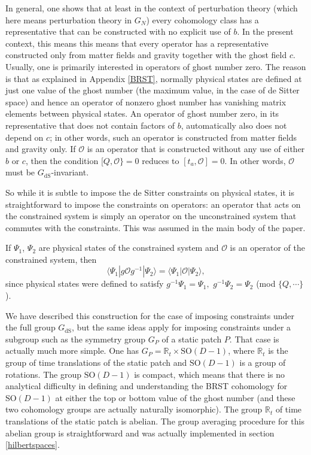 \documentclass[11pt,a4paper]{article}
\def\be{\begin{equation}}
\def\ee{\end{equation}}
\def\O{{\mathcal O}}
\def\R{{\mathbb R}}
\def\dS{{\mathrm{dS}}}
\def\SO{{\mathrm{SO}}}
\def\la{\langle}
\def\ra{\rangle}
\begin{document}
 In general, one shows that at least in the context of perturbation theory (which here means perturbation theory in $G_N$) every cohomology class has a representative that can be constructed with no explicit use of $b$. In the present
context, this  means this means that every operator has
a representative constructed only from matter fields and gravity together with the ghost field $c$.   
Usually, one is primarily interested in operators of ghost number zero.   The reason is that as explained in Appendix \ref{BRST}, normally physical states are defined at just one
value of the ghost number (the maximum value, in the case of de Sitter space) and hence an operator of nonzero ghost number has vanishing matrix elements
between physical states.  An operator of ghost number zero, in its representative that does not contain factors of $b$, automatically also 
does not depend on $c$; in other words, such an operator is constructed from matter fields and gravity only.
    If $\O$ is an operator that is constructed without any use of either $b$ or $c$,
then the condition $[Q,\O\}=0$ reduces to $[t_a,\O]=0$.  In  other words, $\O$ must be $G_\dS$-invariant.   

So while it is subtle to impose the de Sitter constraints on physical states, it is straightforward to impose the constraints on operators: an operator that acts
on the constrained system is simply an operator on the unconstrained system that commutes with the constraints.   This was assumed in the main body of the paper. 

If $\Psi_1$, $\Psi_2$ are physical states of the constrained system and $\O$ is an operator of the constrained system, then
\be\label{toffo}\la\Psi_1| g\O g^{-1}|\Psi_2\ra=\la\Psi_1|\O|\Psi_2\ra, \ee
since physical states were defined to satisfy $g^{-1}\Psi_1=\Psi_1,$ $g^{-1}\Psi_2=\Psi_2$ (mod $\{Q,\cdots\}$).   

We have described this construction for the case of imposing constraints under the full group $G_\dS$, but the same ideas apply for imposing constraints
under a subgroup such as the symmetry group $G_P$ of a static patch $P$. That case is actually much more simple.  One has $G_P=\R_t\times \SO(D-1)$, where
$\R_t$ is the group of time translations of the static patch and $\SO(D-1)$ is a group of rotations.
The group $\SO(D-1)$ is compact, which means that there is no analytical difficulty in defining and understanding the BRST cohomology for $\SO(D-1)$ at
either the top or bottom value of the ghost number (and these two cohomology groups are actually naturally isomorphic).   
The group $\R_t$ of time translations of the static patch is abelian.  The group averaging procedure for this abelian group
is straightforward and was actually implemented in section \ref{hilbertspaces}.
\end{document}

